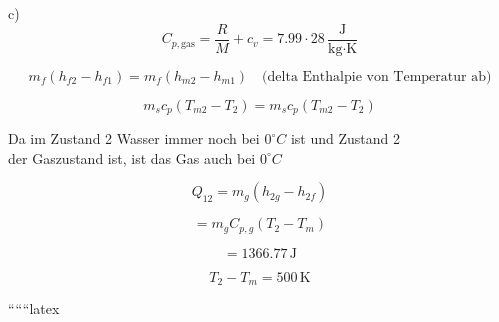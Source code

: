c) 
\[
C_{p, \text{gas}} = \frac{R}{M} + c_v = 7.99 \cdot 28 \, \frac{\text{J}}{\text{kg} \cdot \text{K}}
\]

\[
m_f (h_{f2} - h_{f1}) = m_f (h_{m2} - h_{m1}) \quad \text{(delta Enthalpie von Temperatur ab)}
\]

\[
m_s c_p (T_{m2} - T_2) = m_s c_p (T_{m2} - T_2)
\]

Da im Zustand 2 Wasser immer noch bei $0^\circ C$ ist und Zustand 2 \\
der Gaszustand ist, ist das Gas auch bei $0^\circ C$

\[
Q_{12} = m_g (h_{2g} - h_{2f})
\]

\[
= m_g C_{p,g} (T_2 - T_m)
\]

\[
= 1366.77 \, \text{J}
\]

\[
T_2 - T_m = 500 \, \text{K}
\]

``````latex